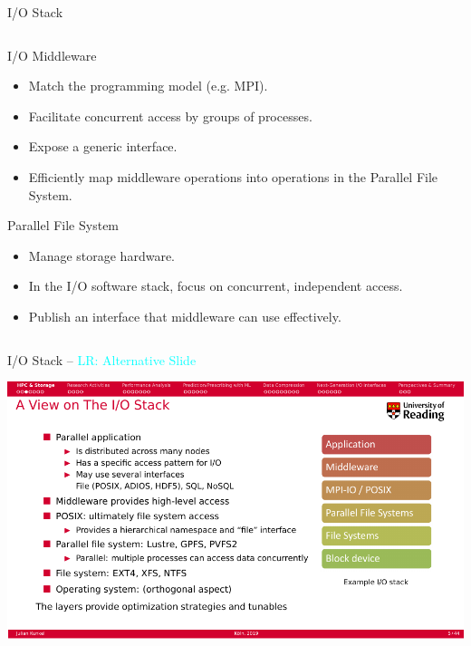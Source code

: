 \documentclass[compress,11pt,xcolor=svgnames,aspectratio=169]{beamer}
\newcommand{\lr}[1]{\textcolor{cyan}{LR: #1}}
\begin{document}
\begin{frame}[fragile]{I/O Stack}
{\begin{columns}
\begin{column}{0.38\textwidth}
\begin{block}{I/O Middleware}
\begin{itemize}
\item Match the programming model (e.g. MPI).
\item Facilitate concurrent access by groups of processes.
\item Expose a generic interface.
\item Efficiently map middleware operations into operations in the Parallel File System.
\end{itemize}
\end{block}
\begin{block}{Parallel File System}
\begin{itemize}
\item Manage storage hardware.
\item In the I/O software stack, focus on concurrent, independent access.
\item Publish an interface that middleware can use effectively.
\end{itemize}
\end{block}
\end{column}
\end{columns}

}

\nocite{esiwace}

\end{frame}

\begin{frame}[fragile]{I/O Stack -- \lr{Alternative Slide}}

\begin{center}
\includegraphics[scale=0.7]{fig/stack2}
\end{center}

\end{frame}
\end{document}
